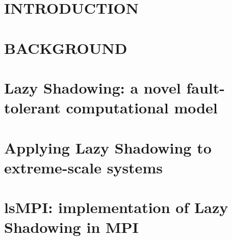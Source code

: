 \documentclass[driverfallback=dvipdfmx,final]{pittetd}
\begin{document}


\tableofcontents
%
%
\chapter{INTRODUCTION}
\label{chapter:intro}


\chapter{BACKGROUND}
\label{chapter:background}


\chapter{Lazy Shadowing: a novel fault-tolerant computational model}
\label{chapter:shadowing}


\chapter{Applying Lazy Shadowing to extreme-scale systems}
\label{chapter:scale}


\chapter{lsMPI: implementation of Lazy Shadowing in MPI}
\label{chapter:implementation}

\end{document}

